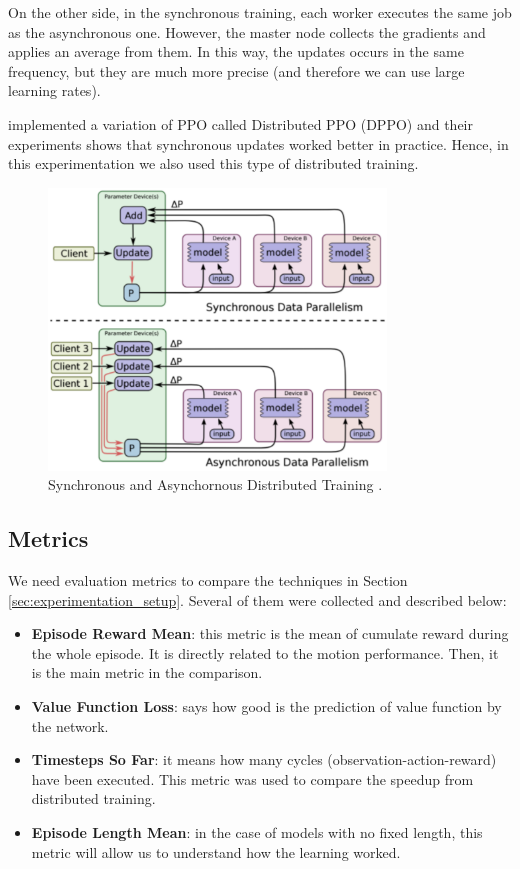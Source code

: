 On the other side, in the synchronous training, each worker executes the same job as the asynchronous one. However, the master node collects the gradients and applies an average from them. In this way, the updates occurs in the same frequency, but they are much more precise (and therefore we can use large learning rates). 

\citeauthor{heess2017} implemented a variation of PPO called Distributed PPO (DPPO) and their experiments shows that synchronous updates worked better in practice. Hence, in this experimentation we also used this type of distributed training.

\begin{figure}[H]
	\centering
	\includegraphics[width=0.8\textwidth]{Cap5/distributedtraining.eps}
	\caption{ Synchronous and Asynchornous Distributed Training \cite{tensorflow2015-whitepaper}.
	}
	\label{fig:distributedtraining}
\end{figure}

\subsection{Metrics}

We need evaluation metrics to compare the techniques in Section \ref{sec:experimentation_setup}. Several of them were collected and described below:

\begin{itemize}
	\item \textbf{Episode Reward Mean}: this metric is the mean of cumulate reward during the whole episode. It is directly related to the motion performance. Then, it is the main metric in the comparison.
	\item \textbf{Value Function Loss}: says how good is the prediction of value function by the network.
	\item \textbf{Timesteps So Far}: it means how many cycles (observation-action-reward) have been executed. This metric was used to compare the speedup from distributed training.
	\item \textbf{Episode Length Mean}: in the case of models with no fixed length, this metric will allow us to understand how the learning worked.
\end{itemize} 


